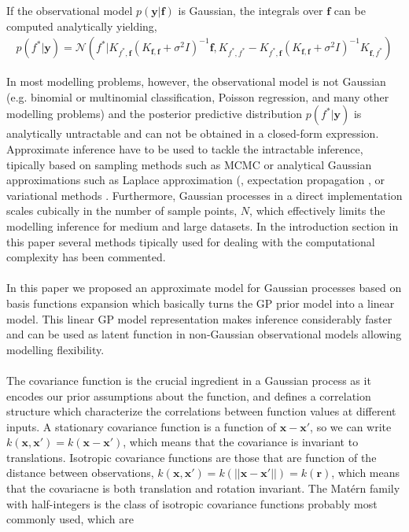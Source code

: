 \documentclass[]{interact}
\theoremstyle{plain}%
\theoremstyle{definition}
\theoremstyle{remark}
\begin{document}
If the observational model $p(\mathbf{y}|\mathbf{f})$ is Gaussian, the integrals over $\mathbf{f}$ can be computed analytically yielding,
\begin{align*}
	p(f^*| \mathbf{y}) = \mathcal{N}(f^*| K_{f^*,\mathbf{f}} (K_{\mathbf{f},\mathbf{f}} + \sigma^2I)^{-1} \mathbf{f},  K_{f^*,f^*}-K_{f^*,\mathbf{f}} (K_{\mathbf{f},\mathbf{f}} + \sigma^2I)^{-1} K_{\mathbf{f},f^*}  )
\end{align*}

In most modelling problems, however, the observational model is not Gaussian (e.g. binomial or multinomial classification, Poisson  regression, and many other modelling problems) and the posterior predictive distribution $p(f^*| \mathbf{y})$ is analytically untractable and can not be obtained in a closed-form expression. Approximate inference have to be used to tackle the intractable inference, tipically based on sampling methods such as MCMC \citep{brooks_2011} or analytical Gaussian approximations such as Laplace approximation (\citep{williams1998bayesian,rasmussen2006gaussian}, expectation propagation \citep{minka2001expectation}, or variational methods \citep{gibbs2000variational,csato2000efficient}. Furthermore, Gaussian processes in a direct implementation scales cubically in the number of sample points, $N$, which effectively limits the modelling inference for medium and large datasets. In the introduction section in this paper several methods tipically used for dealing with the computational complexity has been commented. 
\\
\\
In this paper we proposed an approximate model for Gaussian processes based on basis functions expansion which basically turns the GP prior model into a linear model. This linear GP model representation makes inference considerably faster and can be used as latent function in non-Gaussian observational models allowing modelling flexibility.
\\
\\
The covariance function is the crucial ingredient in a Gaussian process as it encodes our prior assumptions about the function, and defines a correlation structure which characterize the correlations between function values at different inputs. A stationary covariance function is a function of $\mathbf{x}-\mathbf{x}'$, so we can write $k(\mathbf{x},\mathbf{x}') = k(\mathbf{x}-\mathbf{x}')$, which means that the covariance is invariant to translations. Isotropic covariance functions are those that are function of the distance between observations, $k(\mathbf{x},\mathbf{x}') = k(||\mathbf{x}-\mathbf{x}'||) = k(\mathbf{r})$, which means that the covariacne is both translation and rotation invariant. The Mat\'ern family with half-integers is the class of isotropic covariance functions probably most commonly used, which are
\end{document}
